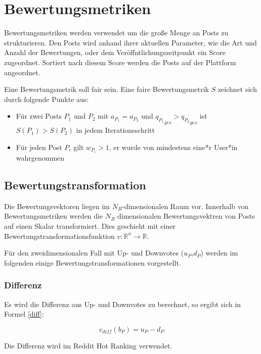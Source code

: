 \chapter{Bewertungsmetriken}
\label{chapter:bewertungsmetriken}

Bewertungsmetriken werden verwendet um die große Menge an Posts zu strukturieren. Den Posts wird anhand ihrer aktuellen Parameter, wie die Art und Anzahl der Bewertungen, oder dem Veröffntlichungszeitpunkt ein Score zugeordnet. 
Sortiert nach diesem Score werden die Posts auf der Plattform angeordnet.

Eine Bewertungsmetrik soll fair sein. Eine faire Bewertungsmetrik $S$ zeichnet sich durch folgende Punkte aus:

\begin{itemize}
	\item Für zwei Posts $P_1$ und $P_2$ mit $a_{P_1} = a_{P_2}$ und ${q_{P_1}}_{ges} > {q_{P_2}}_{ges}$ ist $S(P_1) > S(P_2)$ in jedem Iterationsschritt
	\item Für jeden Post $P_i$ gilt $w_{P_i} > 1$, er wurde von mindestens eine*r User*in wahrgenommen
\end{itemize}

\section{Bewertungstransformation}
\label{voteevaluation}

Die Bewertungsvektoren liegen im $N_B$-dimensionalen Raum vor. Innerhalb von Bewertungsmetriken werden die $N_B$ dimensionalen Bewertungsvektren von Posts auf einen Skalar transformiert. Dies geschieht mit einer Bewertungstransformationsfunktion $v: \mathbb{R}^{n} \rightarrow \mathbb{R}$.


Für den zweidimensionalen Fall mit Up- und Downvotes ($u_P$,$d_P$) werden im folgenden einige Bewertungstransformationen vorgestellt.

\subsection{Differenz}

Es wird die Differenz aus Up- und Downvotes zu berechnet, so ergibt sich in Formel \ref{diff}:

\begin{equation}
\label{diff}
v_{diff}(b_P) = u_P - d_P
\end{equation}

Die Differenz wird im Reddit Hot Ranking verwendet.

